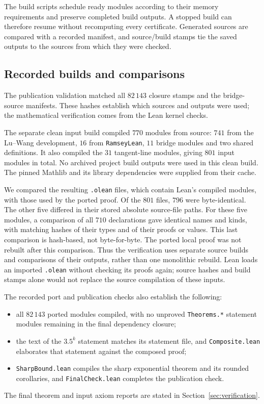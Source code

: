 \documentclass[11pt]{article}
\theoremstyle{definition}
\theoremstyle{remark}
\newcommand{\lean}[1]{\nolinkurl{#1}}
\begin{document}
The build scripts schedule ready modules according to their memory requirements and preserve completed
build outputs. A stopped build can therefore resume without recomputing every certificate.
Generated sources are compared with a recorded manifest, and source/build stamps tie the saved outputs
to the sources from which they were checked.

\subsection{Recorded builds and comparisons}\label{app:build}

The publication validation matched all $82\,143$ closure stamps and the bridge-source manifests.
These hashes establish which sources and outputs were used; the mathematical verification comes from
the Lean kernel checks.

The separate clean input build compiled $770$ modules from source:
$741$ from the Lu--Wang development, $16$ from \texttt{RamseyLean}, $11$ bridge modules and two shared
definitions. It also compiled the $31$ tangent-line modules, giving $801$ input modules in total.
No archived project build outputs were used in this clean build.
The pinned Mathlib and its library dependencies were supplied from their cache.

We compared the resulting \texttt{.olean} files, which contain Lean's compiled modules,
with those used by the ported proof.
Of the $801$ files, $796$ were byte-identical. The other five differed in their stored absolute source-file paths.
For these five modules, a comparison of all $710$ declarations gave identical names and kinds,
with matching hashes of their types and of their proofs or values.
This last comparison is hash-based, not byte-for-byte.
The ported local proof was not rebuilt after this comparison.
Thus the verification uses separate source builds and comparisons of their outputs, rather than
one monolithic rebuild. Lean loads an imported \texttt{.olean} without checking its proofs again;
source hashes and build stamps alone would not replace the source compilation of these inputs.

The recorded port and publication checks also establish the following:
\begin{itemize}
\item all $82\,143$ ported modules compiled, with no unproved \lean{Theorems.*} statement modules remaining
in the final dependency closure;
\item the text of the $3.5^k$ statement matches its statement file, and \lean{Composite.lean} elaborates that
statement against the composed proof;
\item \lean{SharpBound.lean} compiles the sharp exponential theorem and its rounded corollaries, and
\lean{FinalCheck.lean} completes the publication check.
\end{itemize}
The final theorem and input axiom reports are stated in Section~\ref{sec:verification}.
\end{document}
